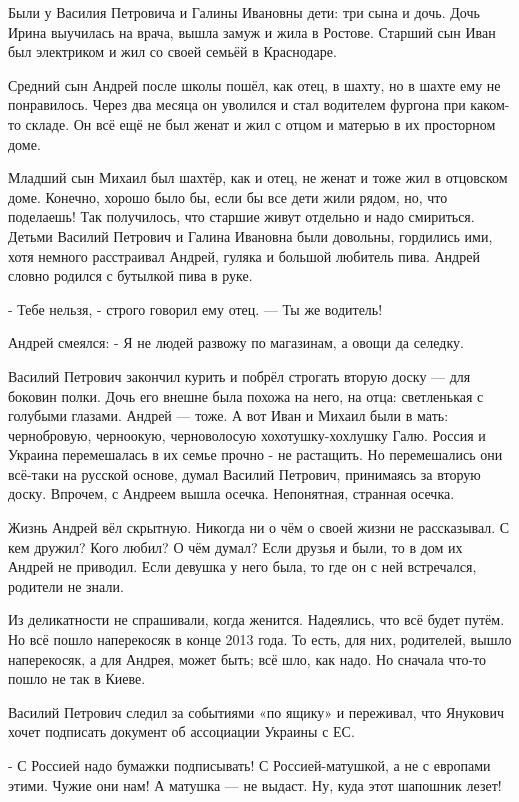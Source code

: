 Были у Василия Петровича и Галины Ивановны дети: три сына и дочь. Дочь Ирина
выучилась на врача, вышла замуж и жила в Ростове.  Старший сын Иван был
электриком и жил со своей семьёй в Краснодаре.

Средний сын Андрей после школы пошёл, как отец, в шахту, но в шахте ему не
понравилось. Через два месяца он уволился и стал водителем фургона при каком-то
складе. Он всё ещё не был женат и жил с отцом и матерью в их просторном доме.

Младший сын Михаил был шахтёр, как и отец, не женат и тоже жил в отцовском
доме. Конечно, хорошо было бы, если бы все дети жили рядом, но, что поделаешь!
Так получилось, что старшие живут отдельно и надо смириться. Детьми Василий
Петрович и Галина Ивановна были довольны, гордились ими, хотя немного
расстраивал Андрей, гуляка и большой любитель пива. Андрей словно родился с
бутылкой пива в руке.


- Тебе нельзя, - строго говорил ему отец. --- Ты же водитель!

Андрей смеялся: - Я не людей развожу по магазинам, а овощи да селедку.

Василий Петрович закончил курить и побрёл строгать вторую доску --- для боковин
полки. Дочь его внешне была похожа на него, на отца: светленькая с голубыми
глазами. Андрей --- тоже. А вот Иван и Михаил были в мать: чернобровую,
черноокую, черноволосую хохотушку-хохлушку Галю. Россия и Украина перемешалась
в их семье прочно - не растащить.  Но перемешались они всё-таки на русской
основе, думал Василий Петрович, принимаясь за вторую доску. Впрочем, с Андреем
вышла осечка. Непонятная, странная осечка.

Жизнь Андрей вёл скрытную. Никогда ни о чём о своей жизни не рассказывал. С кем
дружил? Кого любил? О чём думал? Если друзья и были, то в дом их Андрей не
приводил. Если девушка у него была, то где он с ней встречался, родители не
знали.

Из деликатности не спрашивали, когда женится.  Надеялись, что всё будет путём.
Но всё пошло наперекосяк в конце 2013 года. То есть, для них, родителей, вышло
наперекосяк, а для Андрея, может быть; всё шло, как надо. Но сначала что-то
пошло не так в Киеве.

Василий Петрович следил за событиями «по ящику» и переживал, что Янукович хочет
подписать документ об ассоциации Украины с ЕС.

- С Россией надо бумажки подписывать! С Россией-матушкой, а не с европами
этими. Чужие они нам! А матушка --- не выдаст. Ну, куда этот шапошник лезет!

